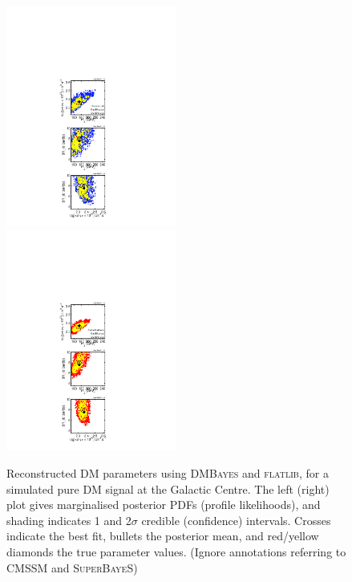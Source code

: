 \documentclass{article}
\begin{document}
\begin{figure}
\includegraphics[trim = 190 0 200 200, clip = true, width=0.5\textwidth]{figs/F1a}
\includegraphics[trim = 190 0 200 200, clip = true, width=0.5\textwidth]{figs/F1b}
\caption{Reconstructed DM parameters using \protect\textsc{DMBayes} and \protect\textsc{flatlib}, for a simulated pure DM signal at the Galactic Centre.  The left (right) plot gives marginalised posterior PDFs (profile likelihoods), and shading indicates 1 and 2$\sigma$ credible (confidence) intervals.  Crosses indicate the best fit, bullets the posterior mean, and red/yellow diamonds the true parameter values. (Ignore annotations referring to CMSSM and \textsc{SuperBayeS})}
\label{pureDM}
\end{figure}
\end{document}
